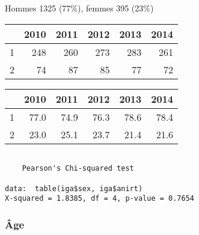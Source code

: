 \documentclass[11pt,a4paper]{article}\usepackage[]{graphicx}\usepackage[]{color}
\makeatletter
\newenvironment{kframe}{%
 \def\at@end@of@kframe{}%
 \ifinner\ifhmode%
  \def\at@end@of@kframe{\end{minipage}}%
  \begin{minipage}{\columnwidth}%
 \fi\fi%
 \def\FrameCommand##1{\hskip\@totalleftmargin \hskip-\fboxsep
 \colorbox{shadecolor}{##1}\hskip-\fboxsep
     \hskip-\linewidth \hskip-\@totalleftmargin \hskip\columnwidth}%
 \MakeFramed {\advance\hsize-\width
   \@totalleftmargin\z@ \linewidth\hsize
   \@setminipage}}%
 {\par\unskip\endMakeFramed%
 \at@end@of@kframe}
\newenvironment{knitrout}{}{} %
\makeatother
\begin{document}
Hommes 1325 (77\%), femmes 395 (23\%)

\begin{table}[H]
\centering
\begin{tabular}{rrrrrr}
  \hline
 & 2010 & 2011 & 2012 & 2013 & 2014 \\ 
  \hline
1 & 248 & 260 & 273 & 283 & 261 \\ 
  2 &  74 &  87 &  85 &  77 &  72 \\ 
   \hline
\end{tabular}
\end{table}
\begin{table}[H]
\centering
\begin{tabular}{rrrrrr}
  \hline
 & 2010 & 2011 & 2012 & 2013 & 2014 \\ 
  \hline
1 & 77.0 & 74.9 & 76.3 & 78.6 & 78.4 \\ 
  2 & 23.0 & 25.1 & 23.7 & 21.4 & 21.6 \\ 
   \hline
\end{tabular}
\end{table}


\begin{knitrout}
\color{fgcolor}\begin{kframe}
\begin{verbatim}

	Pearson's Chi-squared test

data:  table(iga$sex, iga$anirt)
X-squared = 1.8385, df = 4, p-value = 0.7654
\end{verbatim}
\end{kframe}
\end{knitrout}

\subsubsection*{Âge}
\end{document}
